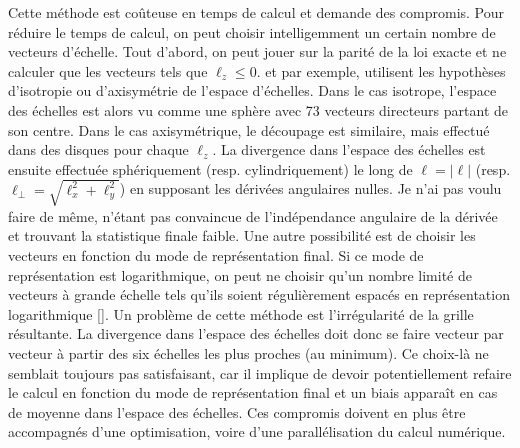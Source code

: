  Cette méthode est coûteuse en temps de calcul et demande des compromis. Pour réduire le temps de calcul, on peut choisir intelligemment un certain nombre de vecteurs d'échelle. Tout d'abord, on peut jouer sur la parité de la loi exacte et ne calculer que les vecteurs tels que $\ell_z \leq 0$.  \cite{ferrand_fluid_2021} et \cite{ferrand_-depth_2022} par exemple, utilisent les hypothèses d'isotropie ou d'axisymétrie de l'espace d'échelles. Dans le cas isotrope, l'espace des échelles est alors vu comme une sphère avec 73 vecteurs directeurs partant de son centre. Dans le cas axisymétrique, le découpage est similaire, mais effectué dans des disques pour chaque $\ell_z$. La divergence dans l'espace des échelles est ensuite effectuée sphériquement (resp. cylindriquement) le long de $\ell = |\boldsymbol{\ell}|$ (resp. $\ell_{\perp} = \sqrt{\ell^2_x + \ell^2_y}$) en supposant les dérivées angulaires nulles. Je n'ai pas voulu faire de même, n'étant pas convaincue de l'indépendance angulaire de la dérivée et trouvant la statistique finale faible. Une autre possibilité est de choisir les vecteurs en fonction du mode de représentation final. Si ce mode de représentation est logarithmique, on peut ne choisir qu'un nombre limité de vecteurs à grande échelle tels qu'ils soient régulièrement espacés en représentation logarithmique [\cite{manzini_local_2022}]. Un problème de cette méthode est l'irrégularité de la grille résultante. La divergence dans l'espace des échelles doit donc se faire vecteur par vecteur à partir des six échelles les plus proches (au minimum). Ce choix-là ne semblait toujours pas satisfaisant, car il implique de devoir potentiellement refaire le calcul en fonction du mode de représentation final et un biais apparaît en cas de moyenne dans l'espace des échelles. Ces compromis doivent en plus être accompagnés d'une optimisation, voire d'une parallélisation du calcul numérique. 
 
